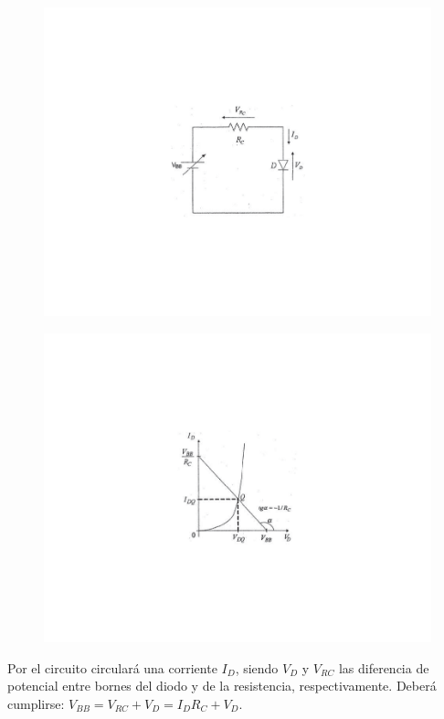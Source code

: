 \documentclass{book} %
\theoremstyle{definition}
\theoremstyle{definition}
\begin{document}
\begin{appendices}
\begin{figure}[!htbp]
\centering
\begin{minipage}{.5\textwidth}
  \centering
  \includegraphics[scale=1]{figurac05.pdf}
  \label{fig:c.5}
\end{minipage}%
\begin{minipage}{.5\textwidth}
  \centering
  \includegraphics[scale=1]{figurac06.pdf}
  \label{fig:c.6}
\end{minipage}
\end{figure}

Por el circuito circulará una corriente $I_D$, siendo $V_D$ y $V_{RC}$ las diferencia de potencial entre bornes del diodo y de la resistencia, respectivamente. Deberá cumplirse: $V_{BB}=V_{RC}+V_D=I_DR_C+V_D$.


\end{appendices}
\end{document}
